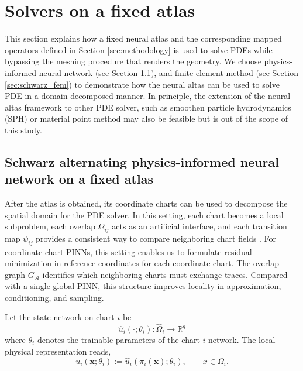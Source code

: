 \documentclass[sort&compress]{svjour3} %
\newcommand{\tensor}[1]{\ensuremath{\boldsymbol{#1}}}
\begin{document}
\section{Solvers on a fixed atlas}
\label{sec:solver_method}
This section explains how a fixed neural atlas and the corresponding mapped operators defined in Section \ref{sec:methodology} is used to solve PDEs while bypassing the meshing procedure that renders the geometry. 
We choose physics-informed neural network (see Section \ref{sec:schwarz_pinn}), and finite element method (see Section \ref{sec:schwarz_fem}) to demonstrate how the neural altas can be used to solve PDE in a domain decomposed manner. In principle, the extension of the neural altas framework to other PDE solver, such as smoothen particle hydrodynamics (SPH) or material point method may also be feasible but is out of the scope of this study. 

\subsection{Schwarz alternating physics-informed neural network on a fixed atlas}
\label{sec:schwarz_pinn}
After the atlas is obtained, its coordinate charts can be used to decompose the spatial domain for the PDE solver. In this setting, each chart becomes a local subproblem, each overlap $\Omega_{ij}$ acts as an artificial interface, and each transition map $\psi_{ij}$ provides a consistent way to compare neighboring chart fields \citep{quarteroni1999domain}. For coordinate-chart PINNs, this setting enables us to formulate residual minimization in reference coordinates for each coordinate chart. The overlap graph $G_{\mathcal A}$ identifies which neighboring charts must exchange traces. Compared with a single global PINN, this structure improves locality in approximation, conditioning, and sampling. 

Let the state network on chart $i$ be
\begin{equation}
\widehat{u}_i(\cdot;\theta_i):\widehat{\Omega}_i\rightarrow \mathbb{R}^{q}
\label{eq:local_network}
\end{equation}
where $\theta_i$ denotes the trainable parameters of the chart-$i$ network. 
The local physical representation reads,
\begin{equation}
u_i(\tensor x;\theta_i):=\widehat{u}_i(\pi_i(\tensor x);\theta_i),
\qquad x\in\Omega_i.
\label{eq:local_physical_field}
\end{equation}
\end{document}
